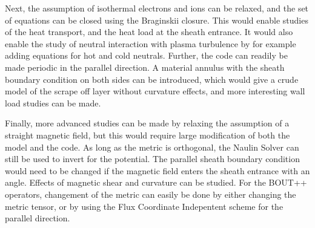 Next, the assumption of isothermal electrons and ions can be relaxed, and the set of equations can be closed using the Braginskii closure.
This would enable studies of the heat transport, and the heat load at the sheath entrance.
It would also enable the study of neutral interaction with plasma turbulence by for example adding equations for hot and cold neutrals.
Further, the code can readily be made periodic in the parallel direction.
A material annulus with the sheath boundary condition on both sides can be introduced, which would give a crude model of the scrape off layer without curvature effects, and more interesting wall load studies can be made.

Finally, more advanced studies can be made by relaxing the assumption of a straight magnetic field, but this would require large modification of both the model and the code.
As long as the metric is orthogonal, the Naulin Solver can still be used to invert for the potential.
The parallel sheath boundary condition would need to be changed if the magnetic field enters the sheath entrance with an angle.
Effects of magnetic shear and curvature can be studied.
For the BOUT++ operators, changement of the metric can easily be done by either changing the metric tensor, or by using the Flux Coordinate Indepentent scheme for the parallel direction.
